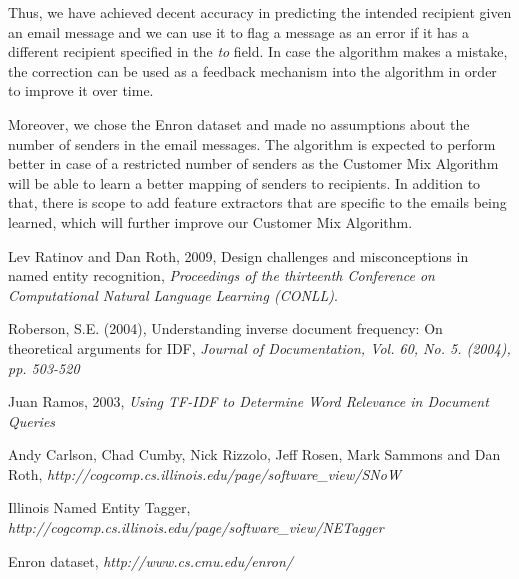 \documentclass[senior,oneside]{UIUC}
\begin{document}
Thus, we have achieved decent accuracy in predicting the intended recipient given an email message and we can use it to flag a message as an error if it has a different recipient specified in the \emph{to} field. In case the algorithm makes a mistake, the correction can be used as a feedback mechanism into the algorithm in order to improve it over time.

Moreover, we chose the Enron dataset and made no assumptions about the number of senders in the email messages. The algorithm is expected to perform better in case of a restricted number of senders as the Customer Mix Algorithm will be able to learn a better mapping of senders to recipients. In addition to that, there is scope to add feature extractors that are specific to the emails being learned, which will further improve our Customer Mix Algorithm.

% 


\begin{thebibliography}{9}

  Lev Ratinov and Dan Roth, 2009,
  Design challenges and misconceptions in named entity recognition,
  \emph{Proceedings of the thirteenth Conference on Computational Natural Language Learning (CONLL)}.

Roberson, S.E. (2004),
Understanding inverse document frequency: On theoretical arguments for IDF,
 \emph{Journal of Documentation, Vol. 60, No. 5. (2004), pp. 503-520}

  Juan Ramos, 2003,
  \emph{Using TF-IDF to Determine Word Relevance in Document Queries}

 Andy Carlson, Chad Cumby, Nick Rizzolo, Jeff Rosen, Mark Sammons and Dan Roth, 
 \emph{http://cogcomp.cs.illinois.edu/page/software\_view/SNoW}

Illinois Named Entity Tagger, 
\emph{http://cogcomp.cs.illinois.edu/page/software\_view/NETagger}

  Enron dataset,
  \emph{http://www.cs.cmu.edu/\texttildelow{}enron/}
 
\end{thebibliography}
\end{document}
